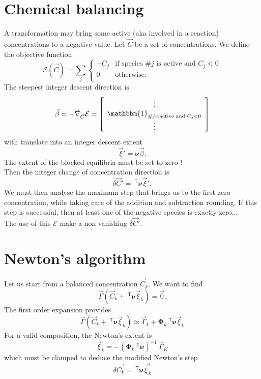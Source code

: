 \documentclass[aps]{revtex4}
\newcommand{\mymat}[1]{\bm{#1}}
\newcommand{\mytrn}[1]{~^{\mathsf{T}}{#1}}
\begin{document}
\section{Chemical balancing}
A transformation may bring some active (aka involved in a reaction) concentrations to a negative value.
Let $\vec{C}$ be a set of concentrations. We define the objective function
$$
	\mathcal{E}(\vec{C}) = \sum_j 
	\left
	\lbrace
		\begin{array}{rl}
		-C_j & \text{if species \#}j\text{ is active and } C_j<0\\
		0    & \text{otherwise.}\\
		\end{array} 
	\right.
$$
The steepest integer descent direction is
$$
	\vec{\beta} = -\vec{\nabla}_{\vec{C}} \mathcal{E} = 
	\left\lbrack
		\begin{array}{c}
		\vdots\\
		\mathbbm{1}_{\text{\#}j=\text{active and } C_j<0}\\
		\vdots
		\end{array}
	\right\rbrack
$$
with translate into an integer descent extent
$$
	\vec{\xi}' = \mymat{\nu} \vec{\beta}.
$$
The extent of the blocked equilibria must be set to zero !\\
Then the integer change of concentration direction is
$$
	\delta\vec{C}' = \mytrn{\mymat{\nu}}\vec{\xi}'.
$$
We must then analyse the maximum step that brings us to the
first zero concentration, while taking care of the addition and subtraction rounding.
If this step is successful, then at least one of the negative species is exactly zero...\\

The use of this $\mathcal{E}$ make a non vanishing $\delta\vec{C}'$.

\section{Newton's algorithm}
Let us start from a balanced concentration $\vec{C}_k$.
We want to find
$$
	\vec{\Gamma}(\vec{C}_k + \mytrn{\mymat{\nu}}\vec{\xi}_k) = \vec{0}.
$$
The first order expansion provides
$$
	\vec{\Gamma}(\vec{C}_k + \mytrn{\mymat{\nu}}\vec{\xi}_k) \simeq 
	\vec{\Gamma}_k + \mymat{\Phi}_k\mytrn{\mymat{\nu}} \vec{\xi}_k
$$
For a valid composition, the Newton's extent is
$$
		\vec{\xi}_k = -\left(\mymat{\Phi}_k\mytrn{\mymat{\nu}}\right)^{-1}\,\vec{\Gamma}_K
$$
which must be clamped to deduce the modified Newton's step
$$
	\delta{\vec{C_k}} = \mytrn{\mymat{\nu}} \vec{\xi}_k^\star
$$
\end{document}
